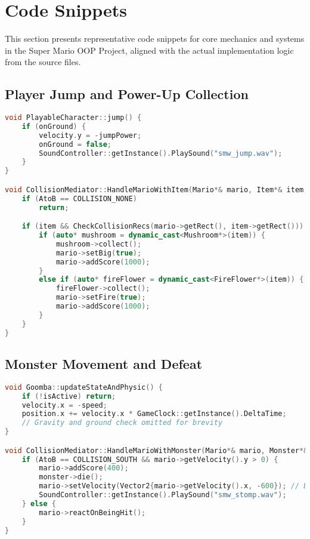 \clearpage
\section{Code Snippets}

\begin{flushleft}
  This section presents representative code snippets for core mechanics and systems in the Super Mario OOP Project, aligned with the actual implementation logic from the source files.  
\end{flushleft}


\subsection*{Player Jump and Power-Up Collection}
\begin{lstlisting}[language=C++, caption={Mario Jump and Power-Up Collection}]
void PlayableCharacter::jump() {
    if (onGround) {
        velocity.y = -jumpPower;
        onGround = false;
        SoundController::getInstance().PlaySound("smw_jump.wav");
    }
}

void CollisionMediator::HandleMarioWithItem(Mario*& mario, Item*& item, CollisionInfo AtoB) {
    if (AtoB == COLLISION_NONE)
        return;

    if (item && CheckCollisionRecs(mario->getRect(), item->getRect())) {
        if (auto* mushroom = dynamic_cast<Mushroom*>(item)) {
            mushroom->collect();
            mario->setBig(true);
            mario->addScore(1000);
        }
        else if (auto* fireFlower = dynamic_cast<FireFlower*>(item)) {
            fireFlower->collect();
            mario->setFire(true);
            mario->addScore(1000);
        }
    }
}
\end{lstlisting}

\subsection*{Monster Movement and Defeat}
\begin{lstlisting}[language=C++, caption={Goomba Movement and Stomp Defeat}]
void Goomba::updateStateAndPhysic() {
    if (!isActive) return;
    velocity.x = -speed;
    position.x += velocity.x * GameClock::getInstance().DeltaTime;
    // Gravity and ground check omitted for brevity
}

void CollisionMediator::HandleMarioWithMonster(Mario*& mario, Monster*& monster, CollisionInfo AtoB) {
    if (AtoB == COLLISION_SOUTH && mario->getVelocity().y > 0) {
        mario->addScore(400);
        monster->die();
        mario->setVelocity(Vector2{mario->getVelocity().x, -600}); // Bounce
        SoundController::getInstance().PlaySound("smw_stomp.wav");
    } else {
        mario->reactOnBeingHit();
    }
}
\end{lstlisting}

